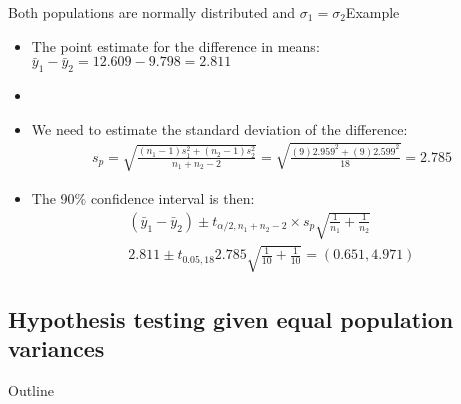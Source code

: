 \documentclass[xcolor=dvipsnames]{beamer}
\begin{document}
\begin{frame}{Both populations are normally distributed and $\sigma_1 = \sigma_2$}{Example}
\begin{itemize}
	\item The point estimate for the difference in means: $\bar{y}_1-\bar{y}_2 = 12.609-9.798 = 2.811$ \pause
	\item[]
	\item We need to estimate the standard deviation of the difference: \pause
	\begin{align*}
	s_p = \sqrt{\frac{(n_1 -1)s_1^2 + (n_2-1)s_2^2}{n_1 + n_2 -2}} = \sqrt{\frac{(9)2.959^2 + (9)2.599^2}{18}} = 2.785
	\end{align*}
	\item The 90\% confidence interval is then: 
	\begin{align*}
	(\bar{y}_1 - \bar{y}_2) \pm t_{\alpha /2, n_1 + n_2 - 2} \times s_p \sqrt{\frac{1}{n_1} + \frac{1}{n_2}}\\
		2.811 \pm t_{0.05, 18} 2.785 \sqrt{\frac{1}{10} + \frac{1}{10}} = (0.651, 4.971)
	\end{align*}
\end{itemize}
\end{frame}

\subsection{Hypothesis testing given equal population variances}
\begin{frame}{Outline}
\tableofcontents[currentsection,subsectionstyle=show/shaded/hide]
\end{frame}
\end{document}
